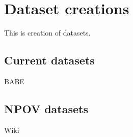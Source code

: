 \chapter{Dataset creations}
This is creation of datasets.

\section{Current datasets}
BABE
\section{NPOV datasets}
Wiki